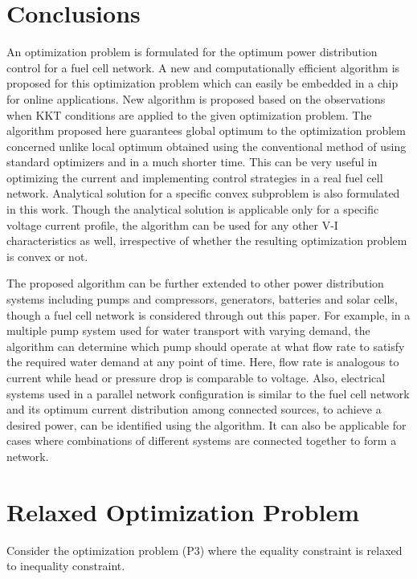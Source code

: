 \documentclass[twocolumn]{autart}
\begin{document}
\section{Conclusions}
An optimization problem is formulated for the optimum power distribution control for a fuel cell network. A new and computationally efficient algorithm is proposed for this optimization problem which can easily be embedded in a chip for online applications. New algorithm is proposed based on the observations when KKT conditions are applied to the given optimization problem. The algorithm proposed here guarantees global optimum to the optimization problem concerned unlike local optimum obtained using the conventional method of using standard optimizers and in a much shorter time. This can be very useful in optimizing the current and implementing control strategies in a real fuel cell network. Analytical solution for a specific convex subproblem is also formulated in this work. Though the analytical solution is applicable only for a specific voltage current profile, the algorithm can be used for any other V-I characteristics as well, irrespective of whether the resulting optimization problem is convex or not. 

The proposed algorithm can be further extended to other power distribution systems including pumps and compressors, generators, batteries and solar cells, though a fuel cell network is considered through out this paper. For example, in a  multiple pump system used for water transport with varying demand, the algorithm can determine which pump should operate at what flow rate to satisfy the required water demand at any point of time. Here, flow rate is analogous to current while head or pressure drop is comparable to voltage. Also, electrical systems used in a parallel network configuration is similar to the fuel cell network and its optimum current distribution among connected sources, to achieve a desired power, can be identified using the algorithm. It can also be applicable for cases where combinations of different systems are connected together to form a network.  


                  

\appendix
\section{Relaxed Optimization Problem} \label{red.optim.pbm}
Consider the optimization problem (P3) where the equality constraint is relaxed to inequality constraint.
\end{document}
